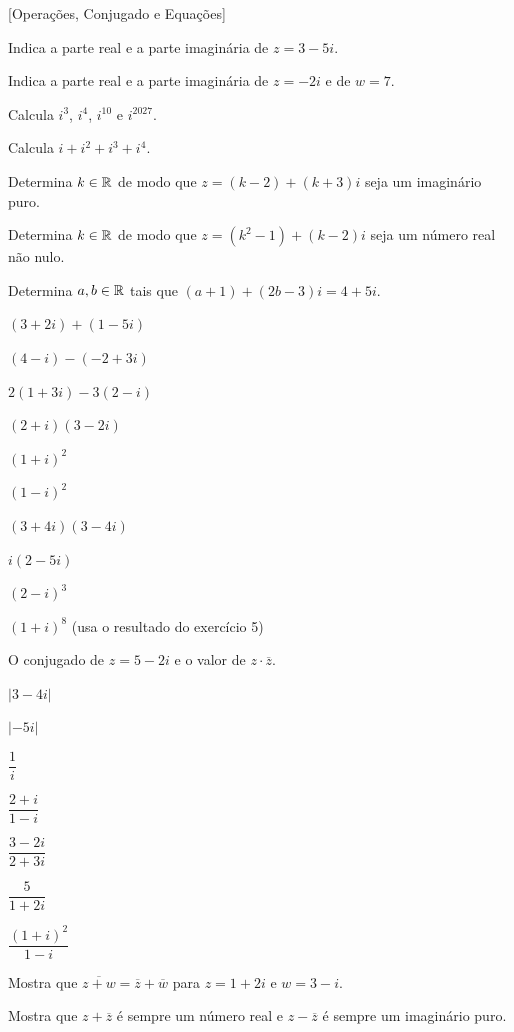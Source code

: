 \documentclass[12pt]{article}
\begin{document}
[Operações, Conjugado e Equações]


\begin{exercicios}
  \item Indica a parte real e a parte imaginária de $z = 3 - 5i$.
  \item Indica a parte real e a parte imaginária de $z = -2i$ e de $w = 7$.
  \item Calcula $i^3$, $i^4$, $i^{10}$ e $i^{2027}$.
  \item Calcula $i + i^2 + i^3 + i^4$.
  \item Determina $k \in \mathbb{R}$ de modo que $z = (k - 2) + (k + 3)i$ seja um imaginário puro.
  \item Determina $k \in \mathbb{R}$ de modo que $z = (k^2 - 1) + (k - 2)i$ seja um número real não nulo.
  \item Determina $a, b \in \mathbb{R}$ tais que $(a + 1) + (2b - 3)i = 4 + 5i$.
\end{exercicios}

\begin{exercicios}
  \item $(3 + 2i) + (1 - 5i)$
  \item $(4 - i) - (-2 + 3i)$
  \item $2(1 + 3i) - 3(2 - i)$
  \item $(2 + i)(3 - 2i)$
  \item $(1 + i)^2$
  \item $(1 - i)^2$
  \item $(3 + 4i)(3 - 4i)$
  \item $i(2 - 5i)$
  \item $(2 - i)^3$
  \item $(1 + i)^{8}$ \; (usa o resultado do exercício 5)
\end{exercicios}

\begin{exercicios}
  \item O conjugado de $z = 5 - 2i$ e o valor de $z \cdot \overline{z}$.
  \item $|3 - 4i|$
  \item $|{-5i}|$
  \item $\dfrac{1}{i}$
  \item $\dfrac{2 + i}{1 - i}$
  \item $\dfrac{3 - 2i}{2 + 3i}$
  \item $\dfrac{5}{1 + 2i}$
  \item $\dfrac{(1 + i)^2}{1 - i}$
  \item Mostra que $\overline{z + w} = \overline{z} + \overline{w}$ para $z = 1 + 2i$ e $w = 3 - i$.
  \item Mostra que $z + \overline{z}$ é sempre um número real e $z - \overline{z}$ é sempre um imaginário puro.
\end{exercicios}
\end{document}
